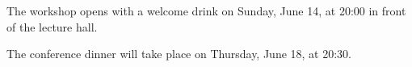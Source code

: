 \documentclass[12pt]{report}
\begin{document}
{}


{}


{}


{\large

\newpage
 \printindex }


\newpage
\thispagestyle{empty}



\vspace{0.5cm}

The workshop opens with a welcome drink on Sunday, June 14, at 20:00 in front of the lecture hall.

The conference dinner will take place on Thursday, June 18, at 20:30.






\end{document}

